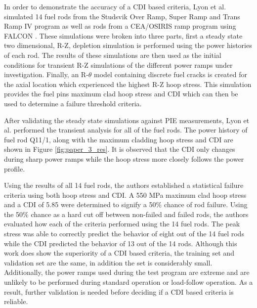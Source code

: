 \documentclass[edeposit,fullpage,11pt]{uiucthesis2009}
\begin{document}
In order to demonstrate the accuracy of a \gls{CDI} based criteria, Lyon et al. simulated 14 fuel rods from the Studsvik Over Ramp, Super Ramp and Trans Ramp IV program as well as rods from a CEA/OSIRIS ramp program using FALCON \cite{killeen_experimental_2004}. 
These simulations were broken into three parts, first a steady state two dimensional, R-Z, depletion simulation is performed using the power histories of each rod.
The results of these simulations are then used as the initial conditions for transient R-Z simulations of the different power ramps under investigation.
Finally, an R-$\theta$ model containing discrete fuel cracks is created for the axial location which experienced the highest R-Z hoop stress.
This simulation provides the fuel pins maximum clad hoop stress and \gls{CDI} which can then be used to determine a failure threshold criteria.

After validating the steady state simulations against \gls{PIE} measurements, Lyon et al. performed the transient analysis for all of the fuel rods. 
The power history of fuel rod Q11/1, along with the maximum cladding hoop stress and \gls{CDI} are shown in Figure \ref{fig:paper_3_res}.
It is observed that the \gls{CDI} only changes during sharp power ramps while the hoop stress more closely follows the power profile.

Using the results of all 14 fuel rods, the authors established a statistical failure criteria using both hoop stress and \gls{CDI}.
A 550 MPa maximum clad hoop stress  and a \gls{CDI} of 5.85 were determined to signify a 50\% chance of rod failure.
Using the 50\% chance as a hard cut off between non-failed and failed rods, the authors evaluated how each of the criteria performed using the 14 fuel rods.
The peak stress was able to correctly predict the behavior of eight out of the 14 fuel rods while the \gls{CDI} predicted the behavior of 13 out of the 14 rods.
Although this work does show the superiority of a \gls{CDI} based criteria, the training set and validation set are the same, in addition the set is considerably small.
Additionally, the power ramps used during the test program are extreme and are unlikely to be performed during standard operation or load-follow operation.
As a result, further validation is needed before deciding if a \gls{CDI} based criteria is reliable.
 
\end{document}
